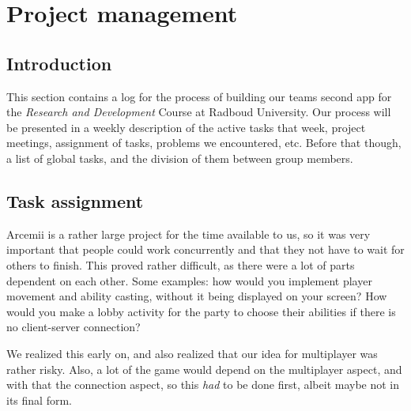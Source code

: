 \documentclass[../main.tex]{subfiles}
\begin{document}
\pagebreak
\section{Project management}
\subsection*{Introduction}
This section contains a log for the process of building our teams second app for the \textit{Research and Development} Course at Radboud University.
Our process will be presented in a weekly description of the active tasks that week, project meetings, assignment of tasks, problems we encountered, etc. Before that though, a list of global tasks, and the division of them between group members.

\subsection{Task assignment}
Arcemii is a rather large project for the time available to us, so it was very important that people could work concurrently and that they not have to wait for others to finish. This proved rather difficult, as there were a lot of parts dependent on each other. Some examples: how would you implement player movement and ability casting, without it being displayed on your screen? How would you make a lobby activity for the party to choose their abilities if there is no client-server connection?

We realized this early on, and also realized that our idea for multiplayer was rather risky. Also, a lot of the game would depend on the multiplayer aspect, and with that the connection aspect, so this \textit{had} to be done first, albeit maybe not in its final form.
\end{document}
